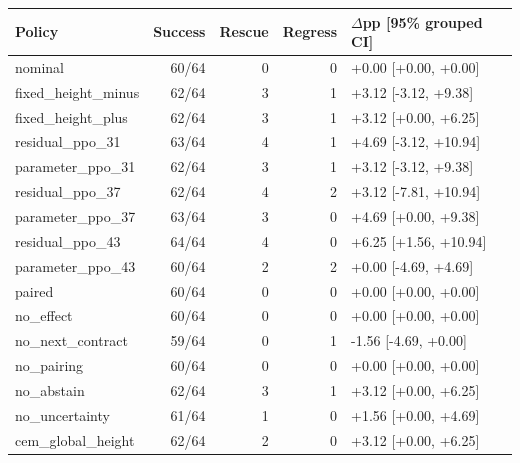 \begin{tabular}{lrrrl}\toprule
Policy & Success & Rescue & Regress & $\Delta$pp [95\% grouped CI] \\
\midrule
nominal & 60/64 & 0 & 0 & +0.00 [+0.00, +0.00] \\
fixed\_height\_minus & 62/64 & 3 & 1 & +3.12 [-3.12, +9.38] \\
fixed\_height\_plus & 62/64 & 3 & 1 & +3.12 [+0.00, +6.25] \\
residual\_ppo\_31 & 63/64 & 4 & 1 & +4.69 [-3.12, +10.94] \\
parameter\_ppo\_31 & 62/64 & 3 & 1 & +3.12 [-3.12, +9.38] \\
residual\_ppo\_37 & 62/64 & 4 & 2 & +3.12 [-7.81, +10.94] \\
parameter\_ppo\_37 & 63/64 & 3 & 0 & +4.69 [+0.00, +9.38] \\
residual\_ppo\_43 & 64/64 & 4 & 0 & +6.25 [+1.56, +10.94] \\
parameter\_ppo\_43 & 60/64 & 2 & 2 & +0.00 [-4.69, +4.69] \\
paired & 60/64 & 0 & 0 & +0.00 [+0.00, +0.00] \\
no\_effect & 60/64 & 0 & 0 & +0.00 [+0.00, +0.00] \\
no\_next\_contract & 59/64 & 0 & 1 & -1.56 [-4.69, +0.00] \\
no\_pairing & 60/64 & 0 & 0 & +0.00 [+0.00, +0.00] \\
no\_abstain & 62/64 & 3 & 1 & +3.12 [+0.00, +6.25] \\
no\_uncertainty & 61/64 & 1 & 0 & +1.56 [+0.00, +4.69] \\
cem\_global\_height & 62/64 & 2 & 0 & +3.12 [+0.00, +6.25] \\
\bottomrule\end{tabular}
